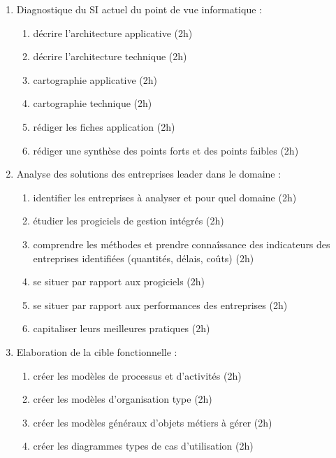 \begin{enumerate}
\begin{enumerate}
            \item Diagnostique du SI actuel du point de vue informatique : 
                \begin{enumerate}
                  \item décrire l'architecture applicative (2h)
                  \item décrire l'architecture technique (2h)
                  \item cartographie applicative (2h)
                  \item cartographie technique (2h)
                  \item rédiger les fiches application (2h)
                  \item rédiger une synthèse des points forts et des points faibles (2h)
                \end{enumerate}
            \item Analyse des solutions des entreprises leader dans le domaine : 
                \begin{enumerate}
                  \item identifier les entreprises à analyser et pour quel domaine (2h)
                  \item étudier les progiciels de gestion intégrés (2h)
                  \item comprendre les méthodes et prendre connaîssance des indicateurs des entreprises identifiées (quantités, délais, coûts) (2h)
                  \item se situer par rapport aux progiciels (2h)
                  \item se situer par rapport aux performances des entreprises (2h)
                  \item capitaliser leurs meilleures pratiques (2h)
                \end{enumerate}
            \item Elaboration de la cible fonctionnelle : 
                \begin{enumerate}
                  \item créer les modèles de processus et d'activités (2h)
                  \item créer les modèles d'organisation type (2h)
                  \item créer les modèles généraux d'objets métiers à gérer (2h)
                  \item créer les diagrammes types de cas d'utilisation (2h)
                \end{enumerate}

\end{enumerate}
\end{enumerate}
